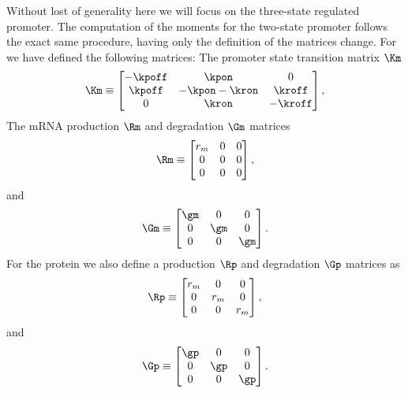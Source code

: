 Without lost of generality here we will focus on the three-state regulated
promoter. The computation of the moments for the two-state promoter follows the
exact same procedure, having only the definition of the matrices change. For
 we have defined the following matrices:
The promoter state transition matrix
$\Km$
\begin{align}
  \Km \equiv
  \begin{bmatrix}
    -\kpoff   & \kpon         & 0\\
    \kpoff    & -\kpon -\kron  & \kroff\\
    0         & \kron         & -\kroff
  \end{bmatrix},
\end{align}
The mRNA production $\Rm$ and degradation $\Gm$ matrices
\begin{equation}
  \Rm \equiv
  \begin{bmatrix}
    r_m   & 0 & 0\\
    0     & 0 & 0\\
    0     & 0 & 0\\
  \end{bmatrix},
\end{equation}
and
\begin{equation}
  \Gm \equiv
  \begin{bmatrix}
    \gm   & 0   & 0\\
    0     & \gm & 0\\
    0     & 0   & \gm\\
  \end{bmatrix}.
\end{equation}
For the protein we also define a production $\Rp$ and degradation $\Gp$ matrices
as
\begin{equation}
  \Rp \equiv
  \begin{bmatrix}
    r_m   & 0   & 0\\
    0     & r_m & 0\\
    0     & 0   & r_m\\
  \end{bmatrix},
\end{equation}
and
\begin{equation}
  \Gp \equiv
  \begin{bmatrix}
    \gp   & 0   & 0\\
    0     & \gp & 0\\
    0     & 0   & \gp\\
  \end{bmatrix}.
\end{equation}

